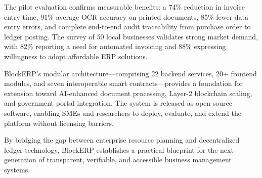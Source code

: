 \documentclass[conference]{IEEEtran}
\begin{document}
The pilot evaluation confirms measurable benefits: a 74\% reduction in invoice entry time, 91\% average OCR accuracy on printed documents, 85\% fewer data entry errors, and complete end-to-end audit traceability from purchase order to ledger posting. The survey of 50 local businesses validates strong market demand, with 82\% reporting a need for automated invoicing and 88\% expressing willingness to adopt affordable ERP solutions.

BlockERP's modular architecture—comprising 22 backend services, 20+ frontend modules, and seven interoperable smart contracts—provides a foundation for extension toward AI-enhanced document processing, Layer-2 blockchain scaling, and government portal integration. The system is released as open-source software, enabling SMEs and researchers to deploy, evaluate, and extend the platform without licensing barriers.

By bridging the gap between enterprise resource planning and decentralized ledger technology, BlockERP establishes a practical blueprint for the next generation of transparent, verifiable, and accessible business management systems.
\end{document}
